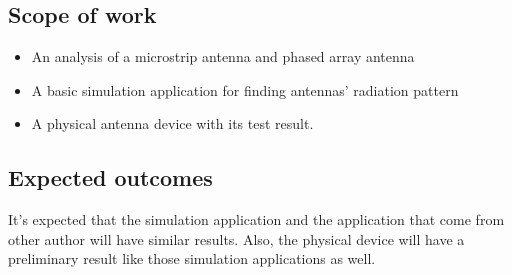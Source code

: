 \documentclass[11pt,a4paper]{article}
\begin{document}
    \subsection{Scope of work}
      \begin{itemize}
        \item An analysis of a microstrip antenna and phased array antenna
        \item A basic simulation application for finding antennas' radiation pattern
        \item A physical antenna device with its test result.
      \end{itemize}

    \subsection{Expected outcomes}
      \indent It's expected that the simulation application and the application that come from other author
      will have similar results. Also, the physical device will have a preliminary result like those simulation
      applications as well.
  
    \newpage

     
    
\end{document}
